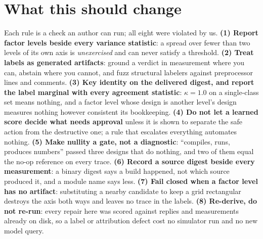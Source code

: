 \documentclass[sigconf,anonymous,nonacm]{acmart}
\begin{document}
\section{What this should change}
\label{sec:changes}
Each rule is a check an author can run; all eight were violated by us.
\textbf{(1) Report factor levels beside every variance statistic}: a spread over fewer than two levels of its own axis is \emph{unexercised} and can never satisfy a threshold. \textbf{(2) Treat labels as generated artifacts}: ground a verdict in measurement where you can, abstain where you cannot, and fuzz structural labelers against preprocessor lines and comments. \textbf{(3) Key identity on the delivered digest, and report the label marginal with every agreement statistic}: $\kappa=1.0$ on a single-class set means nothing, and a factor level whose design is another level's design measures nothing however consistent its bookkeeping. \textbf{(4) Do not let a learned score decide what needs approval} unless it is shown to separate the safe action from the destructive one; a rule that escalates everything automates nothing. \textbf{(5) Make nullity a gate, not a diagnostic}: ``compiles, runs, produces numbers'' passed three designs that do nothing, and two of them equal the no-op reference on every trace. \textbf{(6) Record a source digest beside every measurement}: a binary digest says a build happened, not which source produced it, and a module name says less. \textbf{(7) Fail closed when a factor level has no artifact}: substituting a nearby candidate to keep a grid rectangular destroys the axis both ways and leaves no trace in the labels. \textbf{(8) Re-derive, do not re-run}: every repair here was scored against replies and measurements already on disk, so a label or attribution defect cost no simulator run and no new model query.
\end{document}
